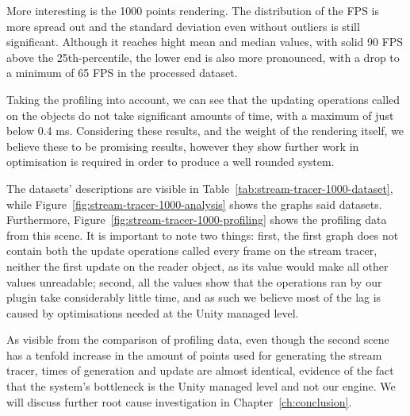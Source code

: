 More interesting is the 1000 points rendering. The distribution of the FPS is more spread out and the standard deviation even without outliers is still significant. Although it reaches hight mean and median values, with solid 90 FPS above the 25th-percentile, the lower end is also more pronounced, with a drop to a minimum of 65 FPS in the processed dataset.

Taking the profiling into account, we can see that the updating operations called on the objects do not take significant amounts of time, with a maximum of just below 0.4 ms. Considering these results, and the weight of the rendering itself, we believe these to be promising results, however they show further work in optimisation is required in order to produce a well rounded system.

The datasets' descriptions are visible in Table~\ref{tab:stream-tracer-1000-dataset}, while Figure~\ref{fig:stream-tracer-1000-analysis} shows the graphs said datasets. Furthermore, Figure~\ref{fig:stream-tracer-1000-profiling} shows the profiling data from this scene. It is important to note two things: first, the first graph does not contain both the update operations called every frame on the stream tracer, neither the first update on the reader object, as its value would make all other values unreadable; second, all the values show that the operations ran by our plugin take considerably little time, and as such we believe most of the lag is caused by optimisations needed at the Unity managed level.

As visible from the comparison of profiling data, even though the second scene has a tenfold increase in the amount of points used for generating the stream tracer, times of generation and update are almost identical, evidence of the fact that the system's bottleneck is the Unity managed level and not our engine. We will discuss further root cause investigation in Chapter~\ref{ch:conclusion}.

